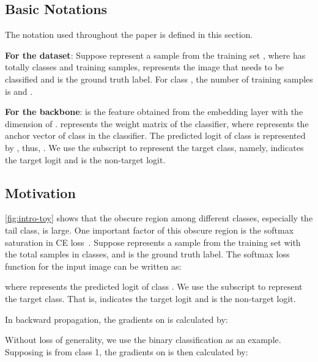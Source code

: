 \documentclass[10pt,twocolumn,letterpaper]{article}
\begin{document}
\subsection{Basic Notations}
The notation used throughout the paper is defined in this section.

\textbf{For the dataset}: Suppose  represent a sample  from the training set , where  has totally  classes and  training samples,  represents the image that needs to be classified and  is the ground truth label. For class , the number of training samples is  and .

\textbf{For the backbone}:
 is the feature obtained from the embedding layer with the dimension of .  represents the weight matrix of the classifier, where  represents the anchor vector of class  in the classifier. The predicted logit of class  is represented by , thus, . We use the subscript  to represent the target class, namely,  indicates the target logit and  is the non-target logit.
\fi

\subsection{Motivation}\label{sec:motivation}

\cref{fig:intro-toy} shows that the obscure region among different classes, especially the tail class, is large. One important factor of this obscure region is the softmax saturation in CE loss~\cite{Chen2017CVPR}. Suppose  represents a sample  from the training set  with the total  samples in  classes, and  is the ground truth label. The softmax loss function for the input image  can be written as:

where  represents the predicted logit of class . We use the subscript   to represent the target class. That is,  indicates the target logit and  is the non-target logit.

In backward propagation, the gradients on  is calculated by:

Without loss of generality, we use the binary classification as an example. Supposing  is from class 1, the gradients on  is then calculated by:
\end{document}
